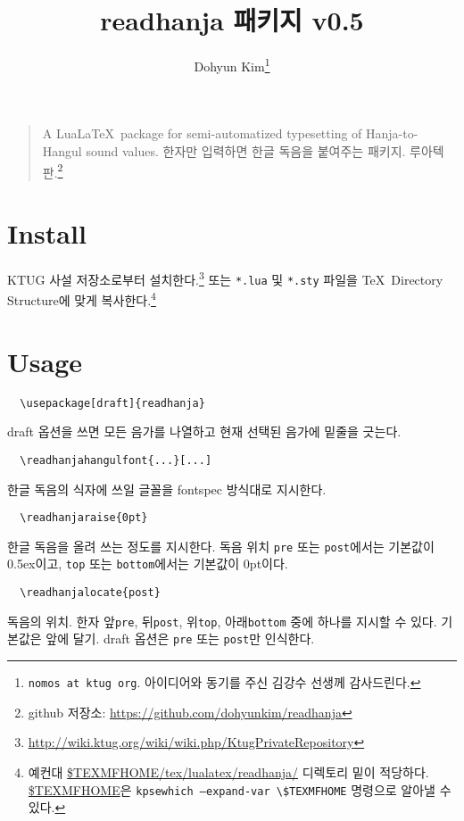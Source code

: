 \documentclass[b5paper]{article}
\begin{document}
\title{\ttfamily readhanja 패키지 v0.5}
\author{Dohyun Kim\thanks{\texttt{nomos at ktug org}.
  아이디어와 동기를 주신 김강수 선생께 감사드린다.}}
\maketitle

\begin{quote}
A Lua\LaTeX\ package for semi-automatized typesetting of
Hanja-to-Hangul sound values.
한자만 입력하면 한글 독음을 붙여주는 패키지. 루아텍 판.\footnote{
  github 저장소: \url{https://github.com/dohyunkim/readhanja}}
\end{quote}

\section*{Install}

KTUG 사설 저장소로부터 설치한다.\footnote{
  \url{http://wiki.ktug.org/wiki/wiki.php/KtugPrivateRepository}}
또는
\verb|*.lua| 및 \verb|*.sty| 파일을 \TeX\ Directory Structure에 맞게 복사한다.\footnote{
  예컨대 \url{$TEXMFHOME/tex/lualatex/readhanja/} 디렉토리 밑이 적당하다.
  \url{$TEXMFHOME}은 \texttt{kpsewhich --expand-var \textbackslash\$TEXMFHOME}
  명령으로 알아낼 수 있다.}

\section*{Usage}

\begin{verbatim}
  \usepackage[draft]{readhanja}
\end{verbatim}
draft 옵션을 쓰면 모든 음가를 나열하고 현재 선택된 음가에
밑줄을 긋는다.

\begin{verbatim}
  \readhanjahangulfont{...}[...]
\end{verbatim}
한글 독음의 식자에 쓰일 글꼴을 fontspec 방식대로 지시한다.

\begin{verbatim}
  \readhanjaraise{0pt}
\end{verbatim}
한글 독음을 올려 쓰는 정도를 지시한다.
독음 위치 \verb|pre| 또는 \verb|post|에서는 기본값이 0.5ex이고,
\verb|top| 또는 \verb|bottom|에서는 기본값이 0pt이다.

\begin{verbatim}
  \readhanjalocate{post}
\end{verbatim}
독음의 위치. 한자 앞\verb|pre|, 뒤\verb|post|,
위\verb|top|, 아래\verb|bottom| 중에 하나를 지시할 수 있다.
기본값은 앞에 달기.
draft 옵션은 \verb|pre| 또는 \verb|post|만 인식한다.
\end{document}
